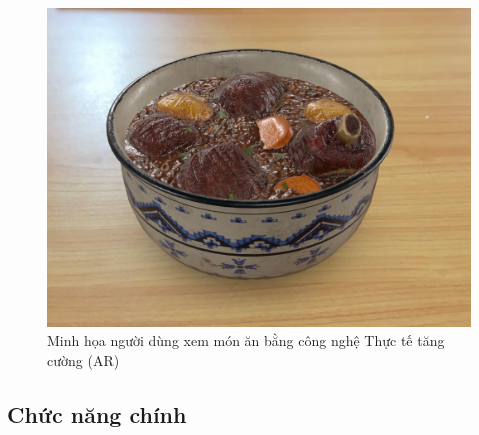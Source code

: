 \documentclass[12pt,a4paper]{article}
\begin{document}
\begin{figure}[H]
    \centering
    \includegraphics[width=\textwidth]{images/minh_hoa_ar_mon_an.png} %
    \caption{Minh họa người dùng xem món ăn bằng công nghệ Thực tế tăng cường (AR)}
    \label{fig:ar_food_view}
\end{figure}

\subsection{Chức năng chính}
\end{document}
